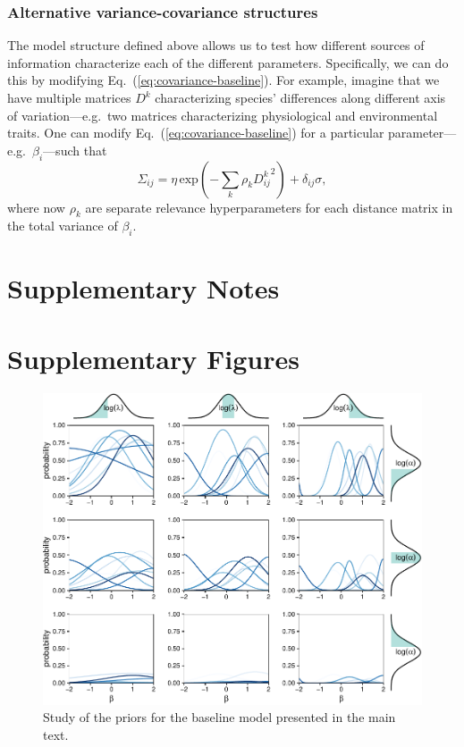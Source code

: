 \documentclass[11pt, a4paper]{article}
\begin{document}
\subsubsection*{Alternative variance-covariance structures}
The model structure defined above allows us to test how different sources of information characterize each of the different parameters. Specifically, we can do this by modifying Eq.~(\ref{eq:covariance-baseline}). For example, imagine that we have multiple matrices $D^k$ characterizing species' differences along different axis of variation---e.g.~two matrices characterizing physiological and environmental traits. One can modify Eq.~(\ref{eq:covariance-baseline}) for a particular parameter---e.g.~$\beta_{i}$---such that
\begin{equation} 
\Sigma_{ij} = \eta\,\text{exp}\left(-\sum_k\rho_{k} {D^{k}_{ij}}^2\right) + \delta_{ij} \sigma ,
\label{eq:covariance-complex}
\end{equation}
where now $\rho_{k}$ are separate relevance hyperparameters for each distance matrix in the total variance of $\beta_i$.

\section*{Supplementary Notes}
\section*{Supplementary Figures}

\begin{figure}[ht]
  \centering
    \vspace{0.5cm}
    \includegraphics[width=1\textwidth]{figures/prior}
    	  \vspace{0.3cm}
	   \caption{Study of the priors for the baseline model presented in the main text.}
      \label{sfig:sensitivity}
\end{figure}
\end{document}
